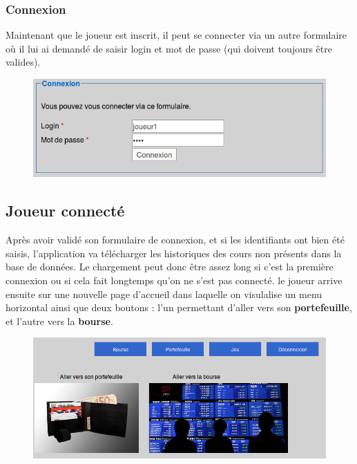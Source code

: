     \subsubsection{Connexion}
    Maintenant que le joueur est inscrit, il peut se connecter via un autre formulaire où il lui ai demandé de saisir login et mot de passe (qui doivent toujours être valides). 
    \begin{figure}[H]
      \center
      \includegraphics[scale=0.5]{../graph/3-connexion.png}
    \end{figure}

  \subsection{Joueur connecté}  
  Après avoir validé son formulaire de connexion, et si les identifiants ont bien été saisis, l'application va télécharger les historiques des cours non présents dans la base de données. Le chargement peut donc être assez long si c'est la première connexion ou si cela fait longtemps qu'on ne s'est pas connecté.
  le joueur arrive ensuite sur une nouvelle page d'accueil dans laquelle on visulalise un menu horizontal ainsi que deux boutons : l'un permettant d'aller vers son \textbf{portefeuille}, et l'autre vers la \textbf{bourse}.
  \begin{figure}[H]
    \center
    \includegraphics[scale=0.5]{../graph/4-accueilconnecte.png}
  \end{figure}
    
